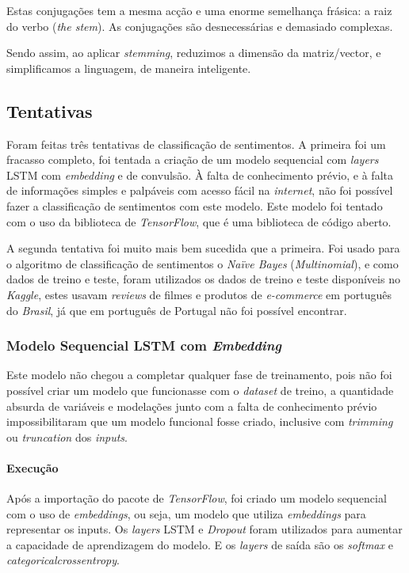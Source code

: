 Estas conjugações tem a mesma acção e uma enorme semelhança frásica: a raiz do verbo (\textit{the stem}). As conjugações são desnecessárias e demasiado complexas.

Sendo assim, ao aplicar \textit{stemming}, reduzimos a dimensão da matriz/vector, e simplificamos a linguagem, de maneira inteligente.

\subsection{Tentativas}

Foram feitas três tentativas de classificação de sentimentos. A primeira foi um fracasso completo, foi tentada a criação de um modelo sequencial com \textit{layers} LSTM com \textit{embedding} e de convulsão. À falta de conhecimento prévio, e à falta de informações simples e palpáveis com acesso fácil na \textit{internet}, não foi possível fazer a classificação de sentimentos com este modelo. Este modelo foi tentado com o uso da biblioteca de \textit{TensorFlow}, que é uma biblioteca de código aberto.

A segunda tentativa foi muito mais bem sucedida que a primeira. Foi usado para o algoritmo de classificação de sentimentos o \textit{Naïve Bayes} (\textit{Multinomial}), e como dados de treino e teste, foram utilizados os dados de treino e teste disponíveis no \textit{Kaggle}, estes usavam \textit{reviews} de filmes e produtos de \textit{e-commerce} em português do \textit{Brasil}, já que em português de Portugal não foi possível encontrar.

\subsubsection{Modelo Sequencial LSTM com \textit{Embedding}}

Este modelo não chegou a completar qualquer fase de treinamento, pois não foi possível criar um modelo que funcionasse com o \textit{dataset} de treino, a quantidade absurda de variáveis e modelações junto com a falta de conhecimento prévio impossibilitaram que um modelo funcional fosse criado, inclusive com \textit{trimming} ou \textit{truncation} dos \textit{inputs}.

\paragraph{Execução\\}

Após a importação do pacote de \textit{TensorFlow}, foi criado um modelo sequencial com o uso de \textit{embeddings}, ou seja, um modelo que utiliza \textit{embeddings} para representar os inputs. Os \textit{layers} LSTM e \textit{Dropout} foram utilizados para aumentar a capacidade de aprendizagem do modelo. E os \textit{layers} de saída são os \textit{softmax} e \textit{categorical\textunderscore crossentropy}.

